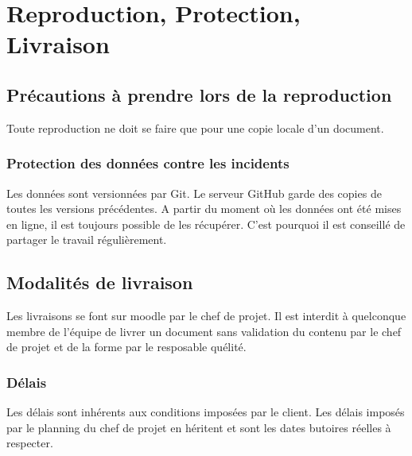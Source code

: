\section{Reproduction, Protection, Livraison}

\subsection{Précautions à prendre lors de la reproduction}
Toute reproduction ne doit se faire que pour une copie locale d'un document.

\subsubsection{Protection des données contre les incidents}
Les données sont versionnées par Git. Le serveur GitHub garde des copies de toutes les versions précédentes.
A partir du moment où les données ont été mises en ligne, il est toujours possible de les récupérer.
C'est pourquoi il est conseillé de partager le travail régulièrement.

\subsection{Modalités de livraison}
Les livraisons se font sur moodle par le chef de projet.
Il est interdit à quelconque membre de l'équipe de livrer un document sans
validation du contenu par le chef de projet et de la forme par le resposable
quélité. 

\subsubsection{Délais}
Les délais sont inhérents aux conditions imposées par le client. Les délais imposés par le
planning du chef de projet en héritent et sont les dates butoires réelles à respecter. 

